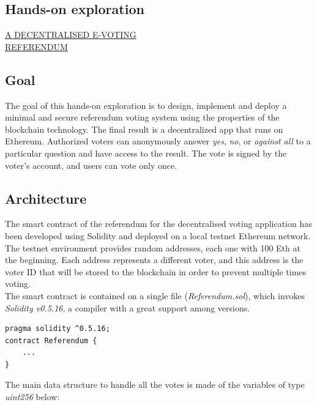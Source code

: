 \documentclass[10pt]{article}
\begin{document}
\begin{multicols}{2}
\section{Hands-on exploration}

\begin{center}
\underline{\uppercase{A decentralised e-voting}}\\
\underline{\uppercase{referendum}}
\end{center}

\subsection{Goal}

The goal of this hands-on exploration is to design, implement and deploy a minimal and secure referendum voting system using the properties of the blockchain technology. The final result is a decentralized app that runs on Ethereum. Authorized voters can anonymously answer \textit{yes}, \textit{no}, or \textit{against all} to a particular question and have access to the result. The vote is signed by the voter's account, and users can vote only once.

\subsection{Architecture}

The smart contract of the referendum for the decentralised voting application has been developed using Solidity and deployed on a local testnet Ethereum network.\\

The testnet environment provides random addresses, each one with 100 Eth at the beginning. Each address represents a different voter, and this address is the voter ID that will be stored to the blockchain in order to prevent multiple times voting.\\

The smart contract is contained on a single file (\textit{Referendum.sol}), which invokes \textit{Solidity v0.5.16}, a compiler with a great support among versions.\\

\begin{lstlisting}[language=Solidity, numbers=none]
pragma solidity ^0.5.16;
contract Referendum {
	...
}
\end{lstlisting}

The main data structure to handle all the votes is made of the variables of type \textit{uint256} below:


\end{multicols}
\end{document}

